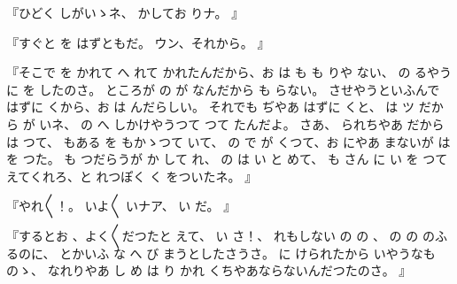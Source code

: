 『ひどく
しがいゝネ、
かしてお
りナ。
』

『すぐと
を
はずともだ。
ウン、それから。
』

『そこで
を
かれて
へ
れて
かれたんだから、お
は
も
も
りや
ない、
の
るやうに
を
したのさ。
ところが
の
が
なんだから
も
らない。
させやうといふんで
はずに
くから、お
は
んだらしい。
それでも
ぢやあ
はずに
くと、
は
ツ
だから
が
いネ、
の
へ
しかけやうつて
つて
たんだよ。
さあ、
られちやあ
だから
は
つて、
もある
を
もかゝつて
いて、
の
で
が
くつて、お
にやあ
まないが
は
を
つた。
も
つだらうが
か
して
れ、
の
は
い
と
めて、
も
さん
に
い
を
つて
えてくれろ、と
れつぽく
く
をついたネ。
』

『やれ〳〵！。
いよ〳〵
いナア、
い
だ。
』

『するとお
、よく〳〵だつたと
えて、
い
さ！、
れもしない
の
の
、
の
の
のふるのに、
とかいふ
な
へ
び
まうとしたさうさ。
に
けられたから
いやうなものゝ、
なれりやあ
し
め
は
り
かれ
くちやあならないんだつたのさ。
』

